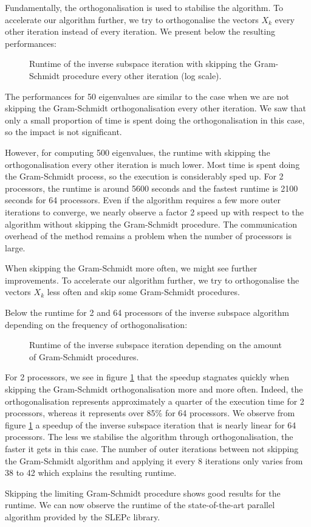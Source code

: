 Fundamentally, the orthogonalisation is used to stabilise the algorithm.
\ifthesis
 To accelerate our algorithm further, we try to orthogonalise the vectors \(X_k\) every other iteration instead of every iteration.
 We present below the resulting performances:

 \begin{figure}[H]
  \centering
  
  \caption{Runtime of the inverse subspace iteration with skipping the Gram-Schmidt procedure every other iteration (log scale).}
 \end{figure}

 The performances for 50 eigenvalues are similar to the case when we are not skipping the Gram-Schmidt orthogonalisation every other iteration.
 We saw that only a small proportion of time is spent doing the orthogonalisation in this case, so the impact is not significant.

 However, for computing 500 eigenvalues, the runtime with skipping the orthogonalisation every other iteration is much lower.
 Most time is spent doing the Gram-Schmidt process, so the execution is considerably sped up.
 For 2 processors, the runtime is around 5600 seconds and the fastest runtime is 2100 seconds for 64 processors.
 Even if the algorithm requires a few more outer iterations to converge, we nearly observe a factor 2 speed up with respect to the algorithm without skipping the Gram-Schmidt procedure.
 The communication overhead of the method remains a problem when the number of processors is large.

 When skipping the Gram-Schmidt more often, we might see further improvements.
\else
 To accelerate our algorithm further, we try to orthogonalise the vectors \(X_k\) less often and skip some Gram-Schmidt procedures.
\fi

Below the runtime for 2 and 64 processors of the inverse subspace algorithm depending on the frequency of orthogonalisation:

\begin{figure}[H]
 \centering
 
 \caption{Runtime of the inverse subspace iteration depending on the amount of Gram-Schmidt procedures.}
 \label{fig:skip_gs}
\end{figure}

For 2 processors, we see in figure \ref{fig:skip_gs} that the speedup stagnates quickly when skipping the Gram-Schmidt orthogonalisation more and more often.
Indeed, the orthogonalisation represents approximately a quarter of the execution time for 2 processors, whereas it represents over 85\% for 64 processors.
We observe from figure \ref{fig:skip_gs} a speedup of the inverse subspace iteration that is nearly linear for 64 processors.
The less we stabilise the algorithm through orthogonalisation, the faster it gets in this case. 
The number of outer iterations between not skipping the Gram-Schmidt algorithm and applying it every 8 iterations only varies from 38 to 42 which explains the resulting runtime.

Skipping the limiting Gram-Schmidt procedure shows good results for the runtime.
We can now observe the runtime of the state-of-the-art parallel algorithm provided by the SLEPc library.

